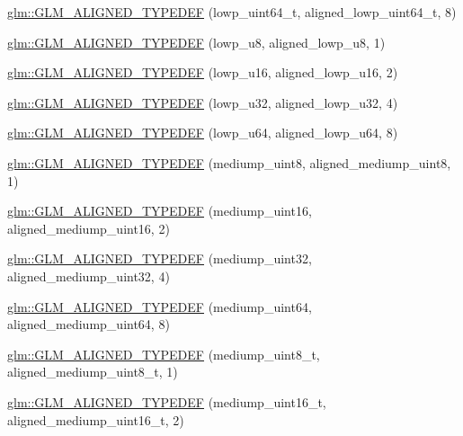 \begin{DoxyCompactItemize}
\item 
\hyperlink{group__gtx__type__aligned_gaace64bddf51a9def01498da9a94fb01c}{glm\-::\-G\-L\-M\-\_\-\-A\-L\-I\-G\-N\-E\-D\-\_\-\-T\-Y\-P\-E\-D\-E\-F} (lowp\-\_\-uint64\-\_\-t, aligned\-\_\-lowp\-\_\-uint64\-\_\-t, 8)
\item 
\hyperlink{group__gtx__type__aligned_gad7bb97c29d664bd86ffb1bed4abc5534}{glm\-::\-G\-L\-M\-\_\-\-A\-L\-I\-G\-N\-E\-D\-\_\-\-T\-Y\-P\-E\-D\-E\-F} (lowp\-\_\-u8, aligned\-\_\-lowp\-\_\-u8, 1)
\item 
\hyperlink{group__gtx__type__aligned_ga404bba7785130e0b1384d695a9450b28}{glm\-::\-G\-L\-M\-\_\-\-A\-L\-I\-G\-N\-E\-D\-\_\-\-T\-Y\-P\-E\-D\-E\-F} (lowp\-\_\-u16, aligned\-\_\-lowp\-\_\-u16, 2)
\item 
\hyperlink{group__gtx__type__aligned_ga31ba41fd896257536958ec6080203d2a}{glm\-::\-G\-L\-M\-\_\-\-A\-L\-I\-G\-N\-E\-D\-\_\-\-T\-Y\-P\-E\-D\-E\-F} (lowp\-\_\-u32, aligned\-\_\-lowp\-\_\-u32, 4)
\item 
\hyperlink{group__gtx__type__aligned_gacca5f13627f57b3505676e40a6e43e5e}{glm\-::\-G\-L\-M\-\_\-\-A\-L\-I\-G\-N\-E\-D\-\_\-\-T\-Y\-P\-E\-D\-E\-F} (lowp\-\_\-u64, aligned\-\_\-lowp\-\_\-u64, 8)
\item 
\hyperlink{group__gtx__type__aligned_ga5faf1d3e70bf33174dd7f3d01d5b883b}{glm\-::\-G\-L\-M\-\_\-\-A\-L\-I\-G\-N\-E\-D\-\_\-\-T\-Y\-P\-E\-D\-E\-F} (mediump\-\_\-uint8, aligned\-\_\-mediump\-\_\-uint8, 1)
\item 
\hyperlink{group__gtx__type__aligned_ga727e2bf2c433bb3b0182605860a48363}{glm\-::\-G\-L\-M\-\_\-\-A\-L\-I\-G\-N\-E\-D\-\_\-\-T\-Y\-P\-E\-D\-E\-F} (mediump\-\_\-uint16, aligned\-\_\-mediump\-\_\-uint16, 2)
\item 
\hyperlink{group__gtx__type__aligned_ga12566ca66d5962dadb4a5eb4c74e891e}{glm\-::\-G\-L\-M\-\_\-\-A\-L\-I\-G\-N\-E\-D\-\_\-\-T\-Y\-P\-E\-D\-E\-F} (mediump\-\_\-uint32, aligned\-\_\-mediump\-\_\-uint32, 4)
\item 
\hyperlink{group__gtx__type__aligned_ga7b66a97a8acaa35c5a377b947318c6bc}{glm\-::\-G\-L\-M\-\_\-\-A\-L\-I\-G\-N\-E\-D\-\_\-\-T\-Y\-P\-E\-D\-E\-F} (mediump\-\_\-uint64, aligned\-\_\-mediump\-\_\-uint64, 8)
\item 
\hyperlink{group__gtx__type__aligned_gaa9cde002439b74fa66120a16a9f55fcc}{glm\-::\-G\-L\-M\-\_\-\-A\-L\-I\-G\-N\-E\-D\-\_\-\-T\-Y\-P\-E\-D\-E\-F} (mediump\-\_\-uint8\-\_\-t, aligned\-\_\-mediump\-\_\-uint8\-\_\-t, 1)
\item 
\hyperlink{group__gtx__type__aligned_ga1ca98c67f7d1e975f7c5202f1da1df1f}{glm\-::\-G\-L\-M\-\_\-\-A\-L\-I\-G\-N\-E\-D\-\_\-\-T\-Y\-P\-E\-D\-E\-F} (mediump\-\_\-uint16\-\_\-t, aligned\-\_\-mediump\-\_\-uint16\-\_\-t, 2)

\end{DoxyCompactItemize}
